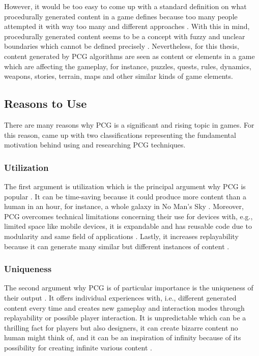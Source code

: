 \documentclass[MGS,Master,english]{twbook}%
\begin{document}
However, it would be too easy to come up with a standard definition on what procedurally generated content in a game defines because too many people attempted it with way too many and different approaches \cite{pcg::whatIsPCG}. With this in mind, procedurally generated content seems to be a concept with fuzzy and unclear boundaries which cannot be defined precisely \cite{pcg::whatIsPCG}. Nevertheless, for this thesis, content generated by PCG algorithms are seen as content or elements in a game which are affecting the gameplay, for instance, puzzles, quests, rules, dynamics, weapons, stories, terrain, maps and other similar kinds of game elements.

\subsection{Reasons to Use}
There are many reasons why PCG is a significant and rising topic in games. For this reason, \citep{pcg::inGameDesign} came up with two classifications representing the fundamental motivation behind using and researching PCG techniques.

\subsubsection{Utilization}
The first argument is utilization which is the principal argument why PCG is popular \cite{pcg::inGameDesign}. It can be time-saving because it could produce more content than a human in an hour, for instance, a whole galaxy in No Man’s Sky \cite{game::noMansSky} \cite{pcg::inGameDesign}. Moreover, PCG overcomes technical limitations concerning their use for devices with, e.g., limited space like mobile devices, it is expandable and has reusable code due to modularity and same field of applications \cite{pcg::inGameDesign}. Lastly, it increases replayability because it can generate many similar but different instances of content \cite{pcg::inGameDesign}.

\subsubsection{Uniqueness}
The second argument why PCG is of particular importance is the uniqueness of their output \cite{pcg::inGameDesign}. It offers individual experiences with, i.e., different generated content every time and creates new gameplay and interaction modes through replayability or possible player interaction. It is unpredictable which can be a thrilling fact for players but also designers, it can create bizarre content no human might think of, and it can be an inspiration of infinity because of its possibility for creating infinite various content \cite{pcg::inGameDesign}.
\end{document}

